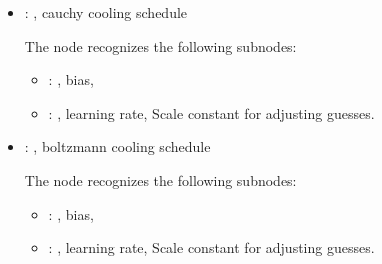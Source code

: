 \begin{itemize}
\begin{itemize}
        \item {}: ,
          cauchy cooling schedule

          The  node recognizes the following subnodes:
          \begin{itemize}
            \item {}: ,
              bias, 

            \item {}: ,
              learning rate, Scale constant for adjusting guesses. 
          \end{itemize}

        \item {}: ,
          boltzmann cooling schedule

          The  node recognizes the following subnodes:
          \begin{itemize}
            \item {}: ,
              bias, 

            \item {}: ,
              learning rate, Scale constant for adjusting guesses. 
          \end{itemize}
      \end{itemize}


\end{itemize}
